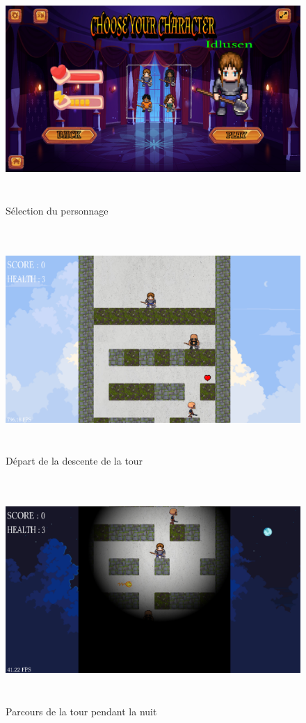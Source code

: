 \documentclass[a4paper,12pt]{article}
\begin{document}
\newpage
\begin{figure}[h]
	\centering
	\includegraphics[height=8.5cm]{img/ecran_selection.png}
	\caption{Sélection du personnage}
	\label{selection_personnage}
\end{figure}
\begin{figure}[h]
	\centering
	\includegraphics[height=8.5cm]{img/ecran_debut.png}
	\caption{Départ de la descente de la tour}
	\label{départ}
\end{figure}
\newpage
\begin{figure}[h]
	\includegraphics[height=8.5cm]{img/ecran_nuit.png}
	\caption{Parcours de la tour pendant la nuit}
	\label{tour_nuit}
\end{figure}
\end{document}
